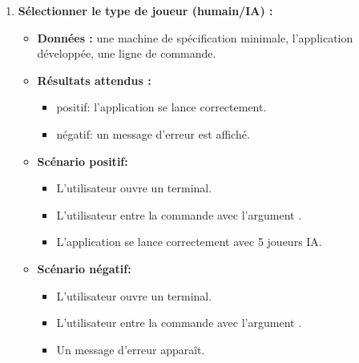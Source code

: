 \begin{enumerate}
    \item \textbf{Sélectionner le type de joueur (humain/IA) :}
    \begin{itemize}
        \item \textbf{Données :} une machine de spécification minimale, l'application développée, une ligne de commande.
        \item \textbf{Résultats attendus :}
        \begin{itemize}
            \item positif: l'application se lance correctement. \item négatif: un message d'erreur est affiché.
        \end{itemize}
        \item \textbf{Scénario positif:}
        \begin{itemize}
            \item L’utilisateur ouvre un terminal.
            \item L’utilisateur entre la commande avec l'argument .
            \item L'application se lance correctement avec 5 joueurs IA.
        \end{itemize}
        \item \textbf{Scénario négatif:}
        \begin{itemize}
            \item L’utilisateur ouvre un terminal.
            \item L’utilisateur entre la commande avec l'argument .
            \item Un message d'erreur apparaît.
        \end{itemize}
    \end{itemize}


\end{enumerate}
